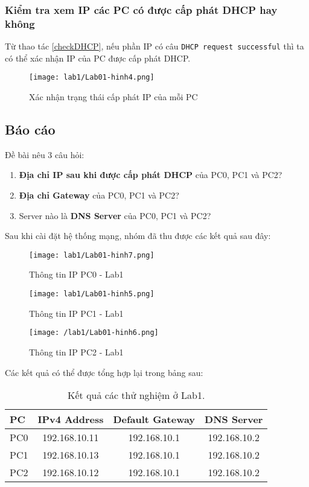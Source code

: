 \documentclass[]{article}
\begin{document}
\subsubsection{Kiểm tra xem IP các PC có được cấp phát DHCP hay không}
Từ thao tác \ref{checkDHCP}, nếu phần IP có câu \texttt{DHCP request successful} thì ta có thể xác nhận IP của PC được cấp phát DHCP.
\begin{figure}[H]
    \centering
    \texttt{[image: lab1/Lab01-hinh4.png]}
    \caption{Xác nhận trạng thái cấp phát IP của mỗi PC}
\end{figure}

\subsection{Báo cáo}
Đề bài nêu 3 câu hỏi:
\begin{enumerate}
    \item \textbf{Địa chỉ IP sau khi được cấp phát DHCP} của PC0, PC1 và PC2?
    \item \textbf{Địa chỉ Gateway} của PC0, PC1 và PC2?
    \item Server nào là \textbf{DNS Server} của PC0, PC1 và PC2?
\end{enumerate}
Sau khi cài đặt hệ thống mạng, nhóm đã thu được các kết quả sau đây:
\begin{figure}[H]
    \centering
    \texttt{[image: lab1/Lab01-hinh7.png]}
    \caption{Thông tin IP PC0 - Lab1}
\end{figure}
\begin{figure}[H]
    \centering
    \texttt{[image: lab1/Lab01-hinh5.png]}
    \caption{Thông tin IP PC1 - Lab1}
\end{figure}
\begin{figure}[H]
    \centering
    \texttt{[image: /lab1/Lab01-hinh6.png]}
    \caption{Thông tin IP PC2 - Lab1}
\end{figure}
Các kết quả có thể được tổng hợp lại trong bảng sau:
\begin{table}[H]
    \centering
    \caption{Kết quả các thử nghiệm ở Lab1.}
    \begin{tabular}[t]{lccc}
        \toprule
        PC&IPv4 Address&Default Gateway&DNS Server\\
        \midrule
        PC0&192.168.10.11&192.168.10.1&192.168.10.2\\
        PC1&192.168.10.13&192.168.10.1&192.168.10.2\\
        PC2&192.168.10.12&192.168.10.1&192.168.10.2\\
        \bottomrule
    \end{tabular}
\end{table}
\end{document}
